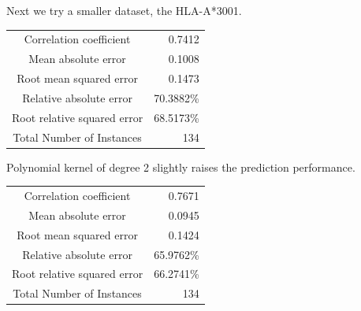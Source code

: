 Next we try a smaller dataset, the HLA-A*3001.

\begin{table}[ht]
\begin{center}
\begin{tabular}{ c r }
Correlation coefficient       &           0.7412 \\
Mean absolute error            &          0.1008 \\
Root mean squared error        &          0.1473 \\
Relative absolute error        &         70.3882\% \\
Root relative squared error    &         68.5173\% \\
Total Number of Instances      &        134 \\
\end{tabular}
\end{center}
\end{table}

Polynomial kernel of degree 2 slightly raises the prediction performance.

\begin{table}[ht]
\begin{center}
\begin{tabular}{ c r }
Correlation coefficient        &          0.7671 \\
Mean absolute error            &          0.0945 \\
Root mean squared error        &          0.1424 \\
Relative absolute error        &         65.9762\% \\
Root relative squared error    &         66.2741\% \\
Total Number of Instances      &        134 \\
\end{tabular}
\end{center}
\end{table}

